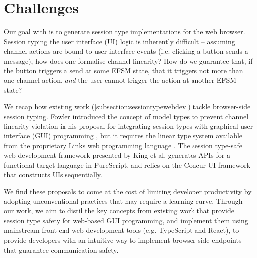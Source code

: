 \section{Challenges}
Our goal with  is to
generate session type implementations for the web browser.
Session typing the user interface (UI) logic is inherently difficult --
assuming channel actions are bound to user interface events 
(i.e. clicking a button sends a message), how does one formalise
channel linearity? How do we guarantee that, if the button
triggers a send at some EFSM state, that it triggers not more than
one channel action, \textit{and} the user cannot trigger the action
at another EFSM state?

We recap how existing work (\cref{subsection:sessiontypewebdev})
tackle browser-side session typing.
Fowler introduced the concept of model types to prevent
channel linearity violation in his proposal for
integrating session types with
graphical user interface (GUI) programming \cite{MVU2020}, but
it requires the linear type system available from
the proprietary Links web programming language \cite{LINKS}.
The session type-safe web development framework presented
by King et al. \cite{PureScript2019} generates APIs for
a functional target language in PureScript, and relies on
the Concur UI framework that constructs UIs sequentially.

We find these proposals to come at the cost of
limiting developer productivity by adopting unconventional practices
that may require a learning curve.
Through our work, we aim to distil the key
concepts from existing work that provide session type safety
for web-based GUI programming, and implement them using
mainstream front-end web development tools (e.g. TypeScript
and React), to provide developers with an intuitive way to implement
browser-side endpoints that guarantee communication safety.